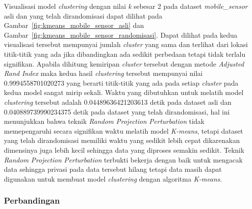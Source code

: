 Visualisasi model \textit{clustering} dengan nilai \textit{k} sebesar 2 pada dataset \textit{mobile\_sensor} asli dan yang telah dirandomisasi dapat dilihat pada Gambar~\ref{fig:kmeans_mobile_sensor_asli} dan Gambar~\ref{fig:kmeans_mobile_sensor_randomisasi}. Dapat dilihat pada kedua visualisasi tersebut mempunyai jumlah \textit{cluster} yang sama dan terlihat dari lokasi titik-titik yang ada jika dibandingkan ada sedikit perbedaan tetapi tidak terlalu signifikan. Apabila dihitung kemiripan \textit{cluster} tersebut dengan metode \textit{Adjusted Rand Index} maka kedua hasil \textit{clustering} tersebut mempunyai nilai 0.9994558701020273 yang berarti titik-titik yang ada pada setiap \textit{cluster} pada kedua model sangat mirip sekali. Waktu yang dibutuhkan untuk melatih model \textit{clustering} tersebut adalah 0.04489636421203613 detik pada dataset asli dan 0.040889739990234375 detik pada dataset yang telah dirandomisasi, hal ini menunjukkan bahwa teknik \textit{Random Projection Perturbation} tidak memepengaruhi secara signifikan waktu melatih model \textit{K-means}, tetapi dataset yang telah dirandomisasi memiliki waktu yang sedikit lebih cepat dikarenakan dimensinya juga lebih kecil sehingga data yang diproses semakin sedikit. Teknik \textit{Random Projection Perturbation} terbukti bekerja dengan baik untuk mengacak data sehingga privasi pada data tersebut hilang tetapi data masih dapat digunakan untuk membuat model \textit{clustering} dengan algoritma \textit{K-means}.

\subsubsection{Perbandingan}
\label{sec:pengujian-clustering-perbandingan}